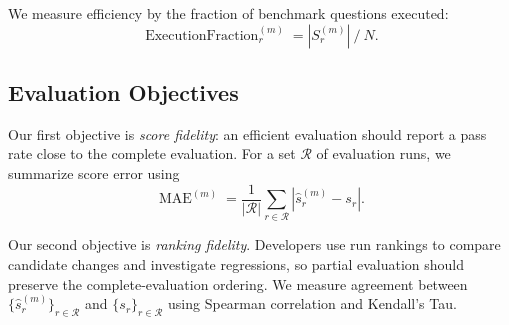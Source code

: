 We measure efficiency by the fraction of benchmark questions executed:
\begin{equation}
  \operatorname{ExecutionFraction}_r^{(m)}
  = |S_r^{(m)}|~/~{N}.
\end{equation}


\subsection{Evaluation Objectives}

Our first objective is \emph{score fidelity}: an efficient evaluation should
report a pass rate close to the complete evaluation. For a set $\mathcal{R}$ of
evaluation runs, we summarize score error using
\begin{equation}
  \operatorname{MAE}^{(m)} =
  \frac{1}{|\mathcal{R}|}
  \sum_{r\in\mathcal{R}}
  \left|\hat{s}_r^{(m)}-s_r\right|.
\end{equation}


Our second objective is \emph{ranking fidelity}. Developers use run rankings to
compare candidate changes and investigate regressions, so partial evaluation
should preserve the complete-evaluation ordering. We measure agreement between
$\{\hat{s}_r^{(m)}\}_{r\in\mathcal{R}}$ and $\{s_r\}_{r\in\mathcal{R}}$ using
Spearman correlation and Kendall’s Tau.
